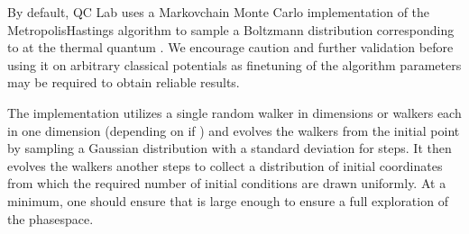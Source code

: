 \documentclass[letterpaper,10pt,english]{sphinxmanual}
\begin{document}
\sphinxAtStartPar
By default, QC Lab uses a Markov\sphinxhyphen{}chain Monte Carlo implementation of the Metropolis\sphinxhyphen{}Hastings algorithm to sample a Boltzmann distribution corresponding to
 at the thermal quantum . We encourage caution and further validation before using it on arbitrary classical
potentials as fine\sphinxhyphen{}tuning of the algorithm parameters may be required to obtain reliable results.

\sphinxAtStartPar
The implementation utilizes a single random walker in  dimensions or 
walkers each in one dimension (depending on if ) and evolves the walkers from the initial point  by sampling a Gaussian distribution with
a standard deviation  for  steps. It then evolves the walkers another  steps to collect a distribution of initial coordinates from which
the required number of initial conditions are drawn uniformly. At a minimum, one should ensure that  is large enough to ensure a full exploration of the phase\sphinxhyphen{}space.
\end{document}
